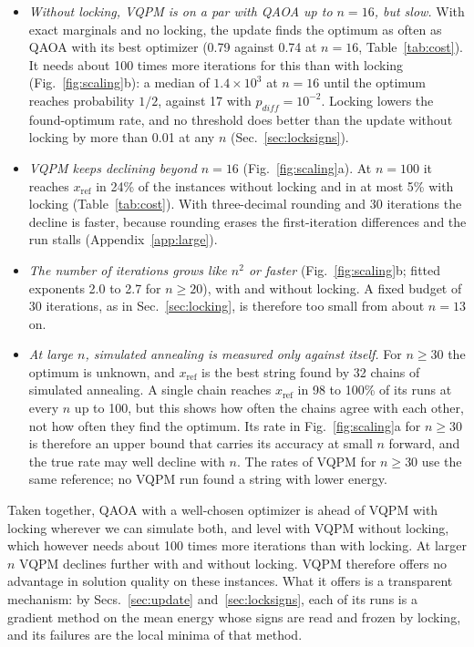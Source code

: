 \documentclass[onecolumn,10pt]{article}
\theoremstyle{remark}
\theoremstyle{plain}
\begin{document}
\begin{itemize}
\item \emph{Without locking, VQPM is on a par with QAOA up to $n=16$, but slow.} With exact marginals and no locking, the update finds the optimum as often as QAOA with its best optimizer (0.79 against 0.74 at $n=16$, Table~\ref{tab:cost}). It needs about 100 times more iterations for this than with locking (Fig.~\ref{fig:scaling}b): a median of $1.4\times10^3$ at $n=16$ until the optimum reaches probability $1/2$, against 17 with $p_{diff}=10^{-2}$. Locking lowers the found-optimum rate, and no threshold does better than the update without locking by more than 0.01 at any $n$ (Sec.~\ref{sec:locksigns}).
\item \emph{VQPM keeps declining beyond $n=16$} (Fig.~\ref{fig:scaling}a). At $n=100$ it reaches $x_{\mathrm{ref}}$ in 24\% of the instances without locking and in at most 5\% with locking (Table~\ref{tab:cost}). With three-decimal rounding and 30 iterations the decline is faster, because rounding erases the first-iteration differences and the run stalls (Appendix~\ref{app:large}).
\item \emph{The number of iterations grows like $n^2$ or faster} (Fig.~\ref{fig:scaling}b; fitted exponents 2.0 to 2.7 for $n\ge20$), with and without locking. A fixed budget of 30 iterations, as in Sec.~\ref{sec:locking}, is therefore too small from about $n=13$ on.
\item \emph{At large $n$, simulated annealing is measured only against itself.} For $n\ge30$ the optimum is unknown, and $x_{\mathrm{ref}}$ is the best string found by 32 chains of simulated annealing. A single chain reaches $x_{\mathrm{ref}}$ in 98 to 100\% of its runs at every $n$ up to 100, but this shows how often the chains agree with each other, not how often they find the optimum. Its rate in Fig.~\ref{fig:scaling}a for $n\ge30$ is therefore an upper bound that carries its accuracy at small $n$ forward, and the true rate may well decline with $n$. The rates of VQPM for $n\ge30$ use the same reference; no VQPM run found a string with lower energy.
\end{itemize}

Taken together, QAOA with a well-chosen optimizer is ahead of VQPM with locking wherever we can simulate both, and level with VQPM without locking, which however needs about 100 times more iterations than with locking. At larger $n$ VQPM declines further with and without locking. VQPM therefore offers no advantage in solution quality on these instances. What it offers is a transparent mechanism: by Secs.~\ref{sec:update} and~\ref{sec:locksigns}, each of its runs is a gradient method on the mean energy whose signs are read and frozen by locking, and its failures are the local minima of that method.
\end{document}
